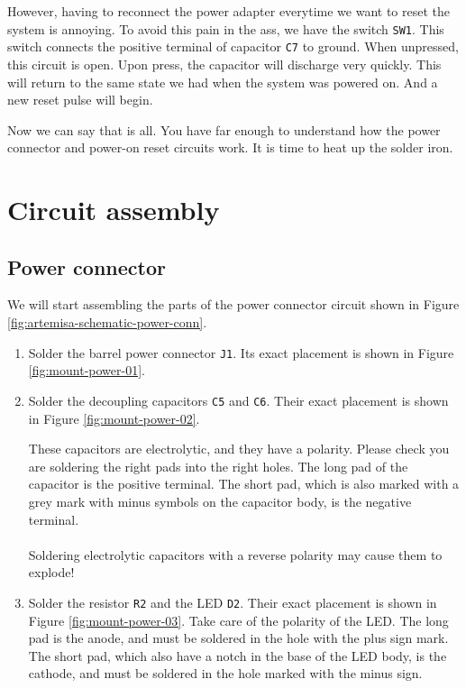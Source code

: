 However, having to reconnect the power adapter everytime we want to reset the system is annoying. To avoid this pain in the ass, we have the switch {\tt SW1}. This switch connects the positive terminal of capacitor {\tt C7} to ground. When unpressed, this circuit is open. Upon press, the capacitor will discharge very quickly. This will return to the same state we had when the system was powered on. And a new reset pulse will begin.

Now we can say that is all. You have far enough to understand how the power connector and power-on reset circuits work. It is time to heat up the solder iron.

\section{Circuit assembly}

\subsection{Power connector}

We will start assembling the parts of the power connector circuit shown in Figure \ref{fig:artemisa-schematic-power-conn}.

\begin{enumerate}
  \item Solder the barrel power connector {\tt J1}. Its exact placement is shown in Figure \ref{fig:mount-power-01}.
  \item Solder the decoupling capacitors {\tt C5} and {\tt C6}. Their exact placement is shown in Figure \ref{fig:mount-power-02}.

        \begin{warning}
          These capacitors are electrolytic, and they have a polarity. Please check you are soldering the right pads into the right holes. The long pad of the capacitor is the positive terminal. The short pad, which is also marked with a grey mark with minus symbols on the capacitor body, is the negative terminal.\\\\

          Soldering electrolytic capacitors with a reverse polarity may cause them to explode!
        \end{warning}
  \item Solder the resistor {\tt R2} and the LED {\tt D2}. Their exact placement is shown in Figure \ref{fig:mount-power-03}. Take care of the polarity of the LED. The long pad is the anode, and must be soldered in the hole with the plus sign mark. The short pad, which also have a notch in the base of the LED body, is the cathode, and must be soldered in the hole marked with the minus sign.
\end{enumerate}

